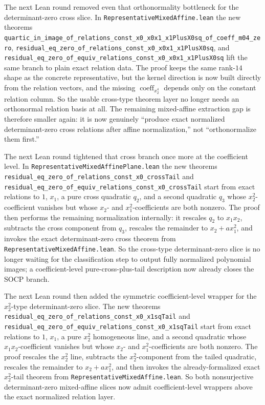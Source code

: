 \documentclass[11pt]{article}
\begin{document}
The next Lean round removed even that orthonormality bottleneck for the
determinant-zero cross slice. In \texttt{RepresentativeMixedAffine.lean} the
new theorems
\texttt{quartic\_in\_image\_of\_relations\_const\_x0\_x0x1\_x1PlusX0sq\_of\_coeff\_m04\_zero},
\texttt{residual\_eq\_zero\_of\_relations\_const\_x0\_x0x1\_x1PlusX0sq}, and
\texttt{residual\_eq\_zero\_of\_equiv\_relations\_const\_x0\_x0x1\_x1PlusX0sq}
lift the same branch to plain exact relation data. The proof keeps the same
rank-\(14\) shape as the concrete representative, but the kernel direction is
now built directly from the relation vectors, and the missing
\(\operatorname{coeff}_{x_2^4}\) depends only on the constant relation column.
So the usable cross-type theorem layer no longer needs an orthonormal relation
basis at all. The remaining mixed-affine extraction gap is therefore smaller
again: it is now genuinely ``produce exact normalized determinant-zero cross
relations after affine normalization,'' not ``orthonormalize them first.''

The next Lean round tightened that cross branch once more at the coefficient
level. In \texttt{RepresentativeMixedAffinePlane.lean} the new theorems
\texttt{residual\_eq\_zero\_of\_relations\_const\_x0\_crossTail} and
\texttt{residual\_eq\_zero\_of\_equiv\_relations\_const\_x0\_crossTail} start
from exact relations to \(1\), \(x_1\), a pure cross quadratic \(q_2\), and a
second quadratic \(q_3\) whose \(x_2^2\)-coefficient vanishes but whose
\(x_2\)- and \(x_1^2\)-coefficients are both nonzero. The proof then performs
the remaining normalization internally: it rescales \(q_2\) to \(x_1x_2\),
subtracts the cross component from \(q_3\), rescales the remainder to
\(x_2 + a x_1^2\), and invokes the exact determinant-zero cross theorem from
\texttt{RepresentativeMixedAffine.lean}. So the cross-type determinant-zero
slice is no longer waiting for the classification step to output fully
normalized polynomial images; a coefficient-level pure-cross-plus-tail
description now already closes the SOCP branch.

The next Lean round then added the symmetric coefficient-level wrapper for the
\(x_2^2\)-type determinant-zero slice. The new theorems
\texttt{residual\_eq\_zero\_of\_relations\_const\_x0\_x1sqTail} and
\texttt{residual\_eq\_zero\_of\_equiv\_relations\_const\_x0\_x1sqTail} start
from exact relations to \(1\), \(x_1\), a pure \(x_2^2\) homogeneous line, and
a second quadratic whose \(x_1x_2\)-coefficient vanishes but whose \(x_2\)- and
\(x_1^2\)-coefficients are both nonzero. The proof rescales the \(x_2^2\) line,
subtracts the \(x_2^2\)-component from the tailed quadratic, rescales the
remainder to \(x_2 + a x_1^2\), and then invokes the already-formalized exact
\(x_2^2\)-tail theorem from \texttt{RepresentativeMixedAffine.lean}. So both
nonsurjective determinant-zero mixed-affine slices now admit coefficient-level
wrappers above the exact normalized relation layer.
\end{document}
